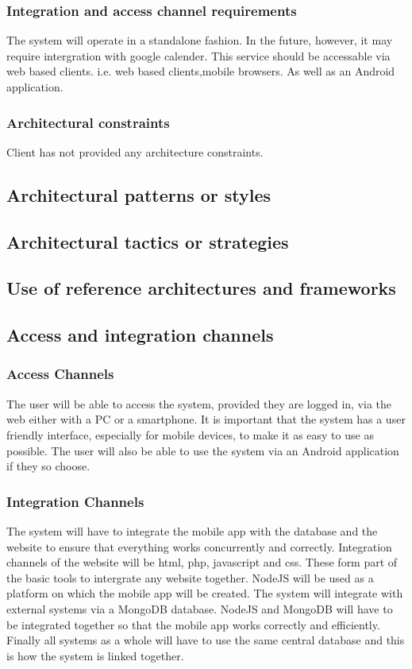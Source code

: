 \documentclass{article}
\begin{document}
			\subsubsection{Integration and access channel requirements}
				The system will operate in a standalone fashion. In the future, however, it may require intergration with google calender.
				This service should be accessable via web based clients. i.e. web based clients,mobile browsers. As well as an Android application.

			\subsubsection{Architectural constraints}
				Client has not provided any architecture constraints.

		\subsection{Architectural patterns or styles}

		\subsection{Architectural tactics or strategies}

		\subsection{Use of reference architectures and frameworks}

		\subsection{Access and integration channels}
			\subsubsection{Access Channels}
				The user will be able to access the system, provided they are logged in, via the web either with a PC or a smartphone.
				It is important that the system has a user friendly interface, especially for mobile devices, to make it as easy to use as possible.
				The user will also be able to use the system via an Android application if they so choose.
			\subsubsection{Integration Channels}
				The system will have to integrate the mobile app with the database and the website to ensure that everything works concurrently and correctly. Integration channels of the website will be html, php, javascript and css. These form part of the basic tools to intergrate any website together. NodeJS will be used as a platform on which the mobile app will be created. The system will integrate with external systems via a MongoDB database. NodeJS and MongoDB will have to be integrated together so that the mobile app works correctly and efficiently. Finally all systems as a whole will have to use the same central database and this is how the system is linked together.   
\end{document}
